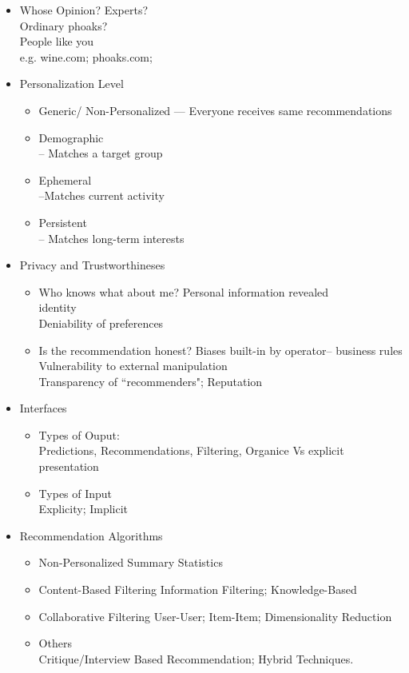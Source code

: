 \documentclass[fleqn,twoside]{article}
\begin{document}
\begin{itemize}
\begin{itemize}
	\end{itemize}
\item Whose Opinion?
		Experts?   \\
		Ordinary phoaks? \\
		People like you  \\
		e.g. wine.com;  phoaks.com; 
\item Personalization Level
	\begin{itemize}
		\item  Generic/ Non-Personalized  --- Everyone receives same recommendations
		\item Demographic \\	
			-- Matches a target group
		\item Ephemeral \\
			--Matches current activity
		\item Persistent \\
			-- Matches long-term interests
	\end{itemize}
\item Privacy and Trustworthineses
	\begin{itemize}
		\item Who knows what about me?
			Personal information revealed \\
			identity \\
			Deniability of preferences
		\item Is the recommendation honest?
			Biases built-in by operator-- business rules \\
			Vulnerability to external manipulation \\
			Transparency of ``recommenders"; Reputation
	\end{itemize}
\item Interfaces
	\begin{itemize}
	\item Types of Ouput: \\
		Predictions, Recommendations, Filtering, Organice Vs explicit presentation
	\item Types of Input\\
		Explicity; Implicit
	\end{itemize}

\item Recommendation Algorithms
	\begin{itemize}
	\item Non-Personalized Summary Statistics
	\item Content-Based Filtering
	   Information Filtering;  Knowledge-Based
	\item Collaborative Filtering
		User-User;  Item-Item;  Dimensionality Reduction
	\item Others \\
		Critique/Interview Based Recommendation;
		Hybrid Techniques.
	\end{itemize}
\end{itemize}
\end{document}
